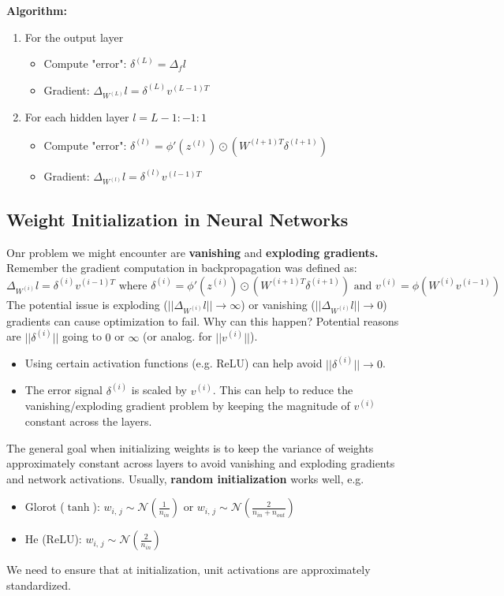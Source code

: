 \documentclass[a4paper]{extarticle}
\begin{document}
\begin{cbox}
    \textbf{Algorithm:}
    \begin{enumerate}
        \item For the output layer
        \begin{itemize}
            \item Compute "error": $\delta^{(L)} = \Delta_fl$
            \item Gradient: $\Delta_{W^{(L)}}l = \delta^{(L)}v^{(L-1)T}$
        \end{itemize}
        \item For each hidden layer $l = L - 1:-1:1$
        \begin{itemize}
            \item Compute "error": $\delta^{(l)} = \phi'(z^{(l)})\odot (W^{(l + 1)T}\delta^{(l+1)})$
            \item Gradient: $\Delta_{W^{(l)}}l = \delta^{(l)}v^{(l-1)T}$
        \end{itemize}
    \end{enumerate}
\end{cbox}

\subsection{Weight Initialization in Neural Networks}

Onr problem we might encounter are \textbf{vanishing} and \textbf{exploding gradients.} Remember the gradient computation in backpropagation was defined as:
\[
    \Delta_{W^{(i)}}l = \delta^{(i)}v^{(i - 1)T} \text{ where } \delta^{(i)} = \phi'(z^{(i)}) \odot (W^{(i + 1)T}\delta^{(i + 1)}) \text{ and } v^{(i)} = \phi(W^{(i)}v^{(i-1)})
\]
The potential issue is exploding ($||\Delta_{W^{(i)}}l|| \to \infty$) or vanishing ($||\Delta_{W^{(i)}}l|| \to 0$) gradients can cause optimization to fail. Why can this happen? Potential reasons are $||\delta^{(i)}||$ going to $0$ or $\infty$ (or analog. for $||v^{(i)}||$).
\begin{itemize}
    \item Using certain activation functions (e.g. ReLU) can help avoid $||\delta^{(i)}|| \to 0$.
    \item The error signal $\delta^{(i)}$ is scaled by $v^{(i)}$. This can help to reduce the vanishing/exploding gradient problem by keeping the magnitude of $v^{(i)}$ constant across the layers.
\end{itemize}

The general goal when initializing weights is to keep the variance of weights approximately constant across layers to avoid vanishing and exploding gradients and network activations. Usually, \textbf{random initialization} works well, e.g.
\begin{itemize}
    \item Glorot ($\tanh$): $w_{i, \, j} \sim \mathcal{N}(\frac{1}{n_{in}})$ or $w_{i, \, j} \sim \mathcal{N}(\frac{2}{n_{in} + n_{out}})$
    \item He (ReLU): $w_{i, \, j} \sim \mathcal{N}(\frac{2}{n_{in}})$
\end{itemize}
We need to ensure that at initialization, unit activations are approximately standardized.
\end{document}
